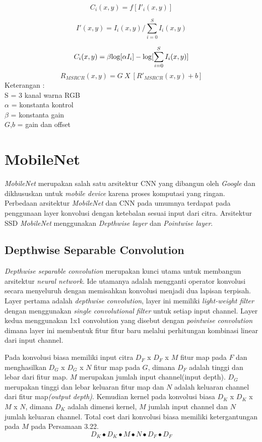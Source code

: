 \begin{equation}
	C_i(x,y) = f[I'_i(x,y)]
\end{equation}

\begin{equation}
	I'(x,y) = I_i(x,y) / \sum_{i=0}^{S}I_i(x,y)
\end{equation}

\begin{equation}
	C_i(x,y) = \beta {\log[\alpha I_i]-\log[\sum_{i=0}^{S}I_i(x,y)]}\\
\end{equation}
\begin{equation}
	R_{MSRCR}(x,y) = G \ X\ [R'_{MSRCR}(x,y)+b]
\end{equation}
\noindent Keterangan :\\
S = 3 kanal warna RGB\\
$\alpha$ = konstanta kontrol\\
$\beta$ = konstanta gain\\
$G$,$b$ = gain dan offset
\section{MobileNet}
\emph{MobileNet} merupakan salah satu arsitektur CNN yang dibangun oleh \emph{Google} dan dikhususkan untuk \emph{mobile device} karena proses komputasi yang ringan. Perbedaan arsitektur \emph{MobileNet} dan CNN pada umumnya terdapat pada penggunaan layer konvolusi dengan ketebalan sesuai input dari citra. Arsitektur SSD \emph{MobileNet} menggunakan \emph{Depthwise layer} dan \emph{Pointwise layer}.
\subsection{Depthwise Separable Convolution}
\emph{Depthwise separable convolution} merupakan kunci utama untuk membangun arsitektur \emph{neural network}. Ide utamanya adalah mengganti operator konvolusi secara menyeluruh dengan memisahkan konvolusi menjadi dua lapisan terpisah. Layer pertama adalah \emph{depthwise convolution}, layer ini memiliki \emph{light-weight filter} dengan menggunakan \emph{single convolutional filter} untuk setiap input channel. Layer kedua menggunakan 1x1 convolution yang disebut dengan \emph{pointwise convolution} dimana layer ini membentuk fitur fitur baru melalui perhitungan kombinasi linear dari input channel. 

Pada konvolusi biasa memiliki input citra $D_F$ x $D_F$ x $M $ fitur map pada $F$ dan menghasilkan $ D_G$ x $D_G$ x $N $ fitur map pada $G$, dimana $D_F$ adalah tinggi dan lebar dari fitur map. $M$ merupakan jumlah input channel(input depth). 
$D_G$ merupakan tinggi dan lebar keluaran fitur map dan $N$ adalah keluaran channel dari fitur map\emph{(output depth)}. Kemudian kernel pada konvolusi biasa $D_K$ x $D_K$ x $M$ x $N$, dimana $D_K$ adalah dimensi kernel, $M$ jumlah input channel dan $N$ jumlah keluaran channel. Total cost dari konvolusi biasa memiliki ketergantungan pada $M$ pada Persamaan 3.22.
\begin{equation}
	D_K \bullet D_K \bullet M \bullet N \bullet D_F \bullet D_F
\end{equation}

